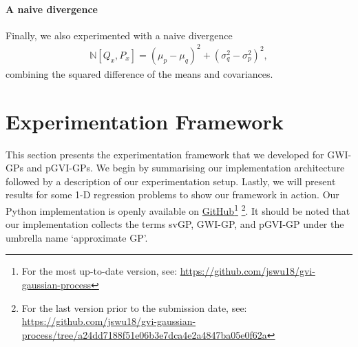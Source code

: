 \documentclass{article}
\numberwithin{equation}{section}
\begin{document}
\paragraph{A naive divergence}Finally, we also experimented with a naive divergence
\begin{align}
    \mathbb{N} \left[Q_{x}, P_{x}\right] = \left(\mu_p - \mu_q\right)^2 + \left(\sigma_q^2-\sigma_p^2\right)^2,
\end{align}
combining the squared difference of the means and covariances.

\newpage
\section{Experimentation Framework}\label{section:experimentation-framework}
This section presents the experimentation framework that we developed for GWI-GPs and pGVI-GPs.
We begin by summarising our implementation architecture followed by a description of our experimentation setup.
Lastly, we will present results for some 1-D regression problems to show our framework in action.
Our Python implementation is openly available on \href{https://github.com/jswu18/gvi-gaussian-process}{GitHub}\footnote{For the most up-to-date version, see: \href{https://github.com/jswu18/gvi-gaussian-process}{https://github.com/jswu18/gvi-gaussian-process}} 
\footnote{
For the last version prior to the submission date, see: \href{https://github.com/jswu18/gvi-gaussian-process/tree/a24dd7188f51e06b3e7dca4e2a4847ba05e0f62a}{https://github.com/jswu18/gvi-gaussian-process/tree/a24dd7188f51e06b3e7dca4e2a4847ba05e0f62a}}. 
It should be noted that our implementation collects the terms svGP, GWI-GP, and pGVI-GP under the umbrella name `approximate GP'.
\end{document}
